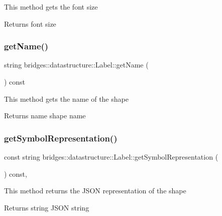 This method gets the font size

\begin{DoxyReturn}{Returns}
font size 
\end{DoxyReturn}
\mbox{\label{classbridges_1_1datastructure_1_1_label_ac2a15e34404b9b7859e658da63a7020f}} 
\subsubsection{\texorpdfstring{getName()}{getName()}}
{\footnotesize\ttfamily string bridges\+::datastructure\+::\+Label\+::get\+Name (\begin{DoxyParamCaption}{ }\end{DoxyParamCaption}) const\hspace{0.3cm}{\ttfamily [inline]}}

This method gets the name of the shape

\begin{DoxyReturn}{Returns}
name shape name 
\end{DoxyReturn}
\mbox{\label{classbridges_1_1datastructure_1_1_label_aa3b7c9e5630ecc8a2534e6db2a220e90}} 
\subsubsection{\texorpdfstring{getSymbolRepresentation()}{getSymbolRepresentation()}}
{\footnotesize\ttfamily const string bridges\+::datastructure\+::\+Label\+::get\+Symbol\+Representation (\begin{DoxyParamCaption}{ }\end{DoxyParamCaption}) const\hspace{0.3cm}{\ttfamily [inline]}, {\ttfamily [virtual]}}

This method returns the J\+S\+ON representation of the shape

\begin{DoxyReturn}{Returns}
string J\+S\+ON string 
\end{DoxyReturn}


